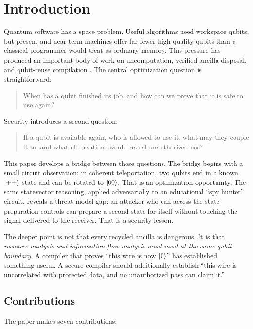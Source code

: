 \section{Introduction}
\label{sec:introduction}

Quantum software has a space problem. Useful algorithms need workspace qubits,
but present and near-term machines offer far fewer high-quality qubits than a
classical programmer would treat as ordinary memory. This pressure has produced
an important body of work on uncomputation, verified ancilla disposal, and
qubit-reuse compilation \cite{rand2019reqwire,decross2023reuse,venev2024uncomputation}.
The central optimization question is straightforward:

\begin{quote}
When has a qubit finished its job, and how can we prove that it is safe to use
again?
\end{quote}

Security introduces a second question:

\begin{quote}
If a qubit is available again, who is allowed to use it, what may they couple it
to, and what observations would reveal unauthorized use?
\end{quote}

This paper develops a bridge between those questions. The bridge begins with a
small circuit observation: in coherent teleportation, two qubits end in a known
$\ket{++}$ state and can be rotated to $\ket{00}$. That is an optimization
opportunity. The same statevector reasoning, applied adversarially to an
educational ``spy hunter'' circuit, reveals a threat-model gap: an attacker who
can access the state-preparation controls can prepare a second state for itself
without touching the signal delivered to the receiver. That is a security
lesson.

The deeper point is not that every recycled ancilla is dangerous. It is that
\emph{resource analysis and information-flow analysis must meet at the same
qubit boundary}. A compiler that proves ``this wire is now $\ket{0}$'' has
established something useful. A secure compiler should additionally establish
``this wire is uncorrelated with protected data, and no unauthorized pass can
claim it.''

\subsection{Contributions}

The paper makes seven contributions:

